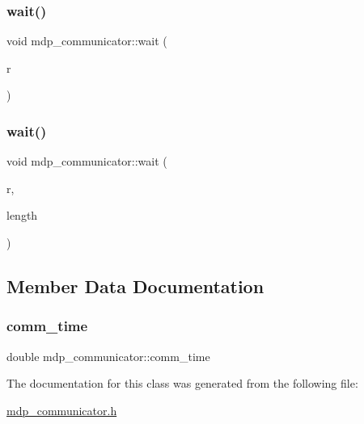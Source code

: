 \subsubsection{\texorpdfstring{wait()}{wait()}\hspace{0.1cm}{\footnotesize\ttfamily [1/2]}}
{\footnotesize\ttfamily void mdp\+\_\+communicator\+::wait (\begin{DoxyParamCaption}\item[{\hyperlink{mdp__communicator_8h_ad8cbf5bc85a849902c39cd29d3f9a8f1}{mdp\+\_\+request} \&}]{r }\end{DoxyParamCaption})\hspace{0.3cm}{\ttfamily [inline]}}

\mbox{\label{classmdp__communicator_aca879bd68c152a2831d37455c7bffcc9}} 
\subsubsection{\texorpdfstring{wait()}{wait()}\hspace{0.1cm}{\footnotesize\ttfamily [2/2]}}
{\footnotesize\ttfamily void mdp\+\_\+communicator\+::wait (\begin{DoxyParamCaption}\item[{\hyperlink{mdp__communicator_8h_ad8cbf5bc85a849902c39cd29d3f9a8f1}{mdp\+\_\+request} $\ast$}]{r,  }\item[{int}]{length }\end{DoxyParamCaption})\hspace{0.3cm}{\ttfamily [inline]}}



\subsection{Member Data Documentation}
\mbox{\label{classmdp__communicator_a0292893d19938e48bac585bdff3d7831}} 
\subsubsection{\texorpdfstring{comm\+\_\+time}{comm\_time}}
{\footnotesize\ttfamily double mdp\+\_\+communicator\+::comm\+\_\+time}



The documentation for this class was generated from the following file\+:\begin{DoxyCompactItemize}
\item 
\hyperlink{mdp__communicator_8h}{mdp\+\_\+communicator.\+h}\end{DoxyCompactItemize}
